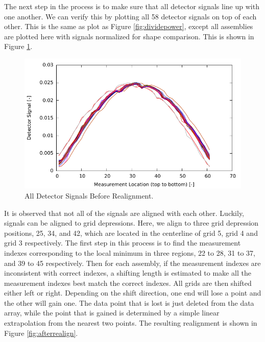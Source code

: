 The next step in the process is to make sure that all detector signals line up with
one another. We can verify this by plotting all 58 detector signals on top of each 
other.  This is the same as plot as Figure \ref{fig:dividepower}, except all assemblies are plotted here with signals normalized for shape comparison. This is shown in Figure \ref{fig:beforerealign}.
\begin{figure}[htbp]
    \centering
    \includegraphics{expdata/figs/before_realign.pdf}
    \caption{All Detector Signals Before Realignment. \label{fig:beforerealign}}
\end{figure}
It is observed that not all of the signals are aligned with each other. Luckily, signals can be 
aligned to grid depressions. Here, we align to three grid depression positions, 25, 34, and 42, which are located in the centerline of grid 5, grid 4 and grid 3 respectively.
The first step in this process is to find the measurement indexes corresponding to the local minimum in three regions, 22 to 28, 31 to 37, and 39 to 45 respectively.
Then for each assembly, if the measurement indexes are inconsistent with correct indexes,
a shifting length is estimated to make all the measurement indexes best match the correct indexes.
All grids are then shifted either left or right. Depending on the 
shift direction, one end will lose a point and the other will gain one. The data point 
that is lost is just deleted from the data array, while the point that is gained is 
determined by a simple linear extrapolation from the nearest two points. The resulting 
realignment is shown in Figure \ref{fig:afterrealign}.
